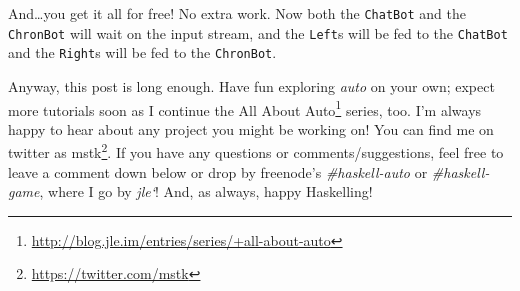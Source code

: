 \documentclass[]{article}
\renewcommand{\href}[2]{#2\footnote{\url{#1}}}
\begin{document}
And\ldots{}you get it all for free! No extra work. Now both the
\texttt{ChatBot} and the \texttt{ChronBot} will wait on the input
stream, and the \texttt{Left}s will be fed to the \texttt{ChatBot} and
the \texttt{Right}s will be fed to the \texttt{ChronBot}.

Anyway, this post is long enough. Have fun exploring \emph{auto} on your
own; expect more tutorials soon as I continue the
\href{http://blog.jle.im/entries/series/+all-about-auto}{All About Auto}
series, too. I'm always happy to hear about any project you might be
working on! You can find me on twitter as
\href{https://twitter.com/mstk}{mstk}. If you have any questions or
comments/suggestions, feel free to leave a comment down below or drop by
freenode's \emph{\#haskell-auto} or \emph{\#haskell-game}, where I go by
\emph{jle`}! And, as always, happy Haskelling!
\end{document}
